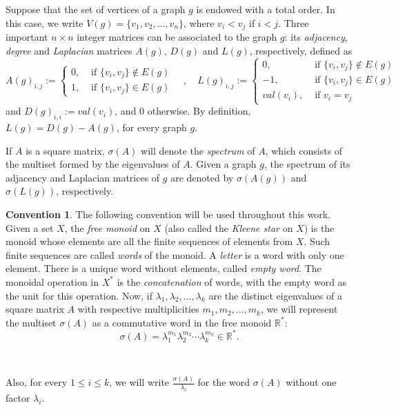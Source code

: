 \documentclass[11pt]{article}
\theoremstyle{definition}
\newtheorem{convention}[theorem]{Convention}
\begin{document}
Suppose that the set of vertices of a graph $g$ is endowed with a total order. In this case, we write $V(g)=\{v_1, v_2, \hdots, v_n\}$, where $v_i < v_j$ if $i<j$. Three important $n\times n$ integer matrices can be associated to the graph $g$: its \emph{adjacency}, \emph{degree} and \emph{Laplacian} matrices $A(g)$, $D(g)$ and $L(g)$, respectively, defined as
\begin{equation}
A(g)_{i,j}:= \left\lbrace \begin{array}{cl}
		0,&\text{ if } \{v_i, v_j\}\not\in E(g)\\
		1,&\text{ if } \{v_i, v_j\}\in E(g)
	\end{array}\right. \quad , \quad
L(g)_{i,j}:=
\left\lbrace \begin{array}{cl}
		0,&\text{ if } \{v_i, v_j\}\not\in E(g)\\
		-1,&\text{ if } \{v_i, v_j\}\in E(g)\\
  val(v_i), &\text{ if }  v_i=v_j
	\end{array}\right.
\end{equation}
and $D(g)_{i,i}:=val(v_i)$, and 0 otherwise. By definition, $L(g)= D(g)-A(g)$, for every graph $g$.

\medbreak

If $A$ is a square matrix, $\sigma(A)$ will denote the \emph{spectrum} of $A$, which consists of the multiset formed by the eigenvalues of $A$. Given a graph $g$, the spectrum of its adjacency and Laplacian matrices of $g$ are denoted by $\sigma(A(g))$ and $\sigma(L(g))$, respectively.
\begin{convention}
The following convention will be used throughout this work. Given a set $X$, the \emph{free monoid} on $X$ (also called the \emph{Kleene star} on $X$) is the monoid whose elements are all the finite sequences of elements from $X$. Such finite sequences are called \emph{words} of the monoid. A \emph{letter} is a word with only one element. There is a unique word without elements, called \emph{empty word}. The monoidal operation in $X^*$ is the \emph{concatenation} of words, with the empty word as the unit for this operation. Now, if $\lambda_1, \lambda_2,..., \lambda_k$ are the distinct eigenvalues of a square matrix $A$ with respective multiplicities $m_1, m_2,..., m_k$, we will represent the multiset $\sigma(A)$ as a commutative word in the free monoid $\mathbb{R}^*$:
\begin{equation}
\sigma(A)=\lambda^{m_1}_1\lambda^{m_2}_2\cdots\lambda^{m_k}_k \in \mathbb{R}^*.
\end{equation}

\

Also, for every $1 \leq i \leq k$, we will write $\displaystyle \frac{\sigma(A)}{\lambda_i}$ for the word $\sigma(A)$ without one factor $\lambda_i$.
\end{convention}
\medbreak
\end{document}
